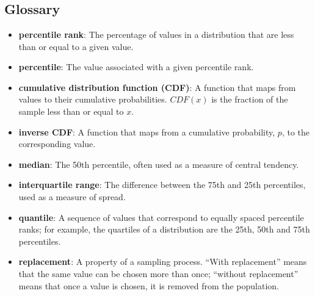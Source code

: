  \chapter{ }  \section*{Glossary} \begin{itemize}
	
	\item {\bf percentile rank}: The percentage of values in a distribution that are
	less than or equal to a given value.
	
	\item {\bf percentile}: The value associated with a given percentile rank.
	
	\item {\bf cumulative distribution function (CDF)}: A function that maps
	from values to their cumulative probabilities.  $CDF(x)$ is the
	fraction of the sample less than or equal to $x$.  
	
	\item {\bf inverse CDF}: A function that maps from a cumulative probability,
	$p$, to the corresponding value.
	
	\item {\bf median}: The 50th percentile, often used as a measure of central
	tendency.  
	
	\item {\bf interquartile range}: The difference between
	the 75th and 25th percentiles, used as a measure of spread.
	
	\item {\bf quantile}: A sequence of values that correspond to equally spaced
	percentile ranks; for example, the quartiles of a distribution are
	the 25th, 50th and 75th percentiles.
	
	\item {\bf replacement}: A property of a sampling process. ``With replacement''
	means that the same value can be chosen more than once; ``without
	replacement'' means that once a value is chosen, it is removed from
	the population.
	
\end{itemize}



